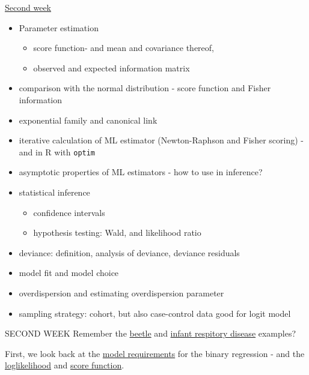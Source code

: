 \documentclass[
  ignorenonframetext,
]{beamer}
\providecommand{\tightlist}{%
  \setlength{\itemsep}{0pt}\setlength{\parskip}{0pt}}
\begin{document}
\begin{frame}[fragile]
\begin{block}{\hyperlink{secondweek}{Second week}}
\label{second-week}
\begin{itemize}
\tightlist
\item
  Parameter estimation

  \begin{itemize}
  \tightlist
  \item
    score function- and mean and covariance thereof,
  \item
    observed and expected information matrix
  \end{itemize}
\item
  comparison with the normal distribution - score function and Fisher
  information
\item
  exponential family and canonical link
\item
  iterative calculation of ML estimator (Newton-Raphson and Fisher
  scoring) - and in R with \texttt{optim}
\item
  asymptotic properties of ML estimators - how to use in inference?
\item
  statistical inference

  \begin{itemize}
  \tightlist
  \item
    confidence intervals
  \item
    hypothesis testing: Wald, and likelihood ratio
  \end{itemize}
\item
  deviance: definition, analysis of deviance, deviance residuals
\item
  model fit and model choice
\item
  overdispersion and estimating overdispersion parameter
\item
  sampling strategy: cohort, but also case-control data good for logit
  model
\end{itemize}
\end{block}
\end{frame}

\begin{frame}
\begin{block}{SECOND WEEK}
\label{second-week-1}
Remember the \hyperlink{beetle1}{beetle} and \hyperlink{infant1}{infant
respitory disease} examples?

First, we look back at the \hyperlink{binaryregassump}{model
requirements} for the binary regression - and the
\hyperlink{loglik}{loglikelihood} and \hyperlink{score}{score function}.
\end{block}
\end{frame}
\end{document}

